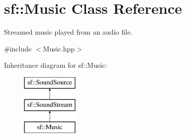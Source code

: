 \hypertarget{classsf_1_1Music}{\section{sf\-:\-:Music Class Reference}
\label{classsf_1_1Music}
}


Streamed music played from an audio file.  




{\ttfamily \#include $<$Music.\-hpp$>$}

Inheritance diagram for sf\-:\-:Music\-:\begin{figure}[H]
\begin{center}
\leavevmode
\includegraphics[height=3.000000cm]{classsf_1_1Music}
\end{center}
\end{figure}
